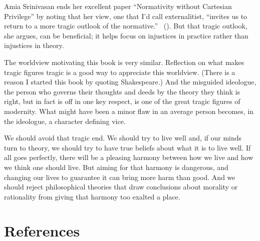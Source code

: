 \documentclass[
  10pt,
  letterpaper,
  twoside]{scrbook}
\begin{document}
Amia Srinivasan ends her excellent paper ``Normativity without Cartesian
Privilege'' by noting that her view, one that I'd call externalitist,
``invites us to return to a more tragic outlook of the normative.''
~(). But that tragic
outlook, she argues, can be beneficial; it helps focus on injustices in
practice rather than injustices in theory.

The worldview motivating this book is very similar. Reflection on what
makes tragic figures tragic is a good way to appreciate this worldview.
(There is a reason I started this book by quoting Shakespeare.) And the
misguided ideologue, the person who governs their thoughts and deeds by
the theory they think is right, but in fact is off in one key respect,
is one of the great tragic figures of modernity. What might have been a
minor flaw in an average person becomes, in the ideologue, a character
defining vice.

We should avoid that tragic end. We should try to live well and, if our
minds turn to theory, we should try to have true beliefs about what it
is to live well. If all goes perfectly, there will be a pleasing harmony
between how we live and how we think one should live. But aiming for
that harmony is dangerous, and changing our lives to guarantee it can
bring more harm than good. And we should reject philosophical theories
that draw conclusions about morality or rationality from giving that
harmony too exalted a place.


\chapter*{References}\label{references}

\end{document}
